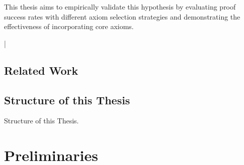 \documentclass[english,version-2020-11]{uzl-thesis}
\begin{document}
This thesis aims to empirically validate this hypothesis by evaluating proof success rates with different axiom selection strategies and demonstrating the effectiveness of incorporating core axioms.




\lstMakeShortInline[style=code,style=inline,language={[LaTeX]tex},moretexcs={chapter}]|


\section{Related Work}
  \cite{Schon2024}
  \cite{Àlvez2014}
  \cite{Hoder2011}
  \cite{Roederer2009}
  \cite{Sutcliffe2007}
%


\section{Structure of this Thesis}


Structure of this Thesis.



%

\chapter{Preliminaries}
\label{chapter-use}
\end{document}
